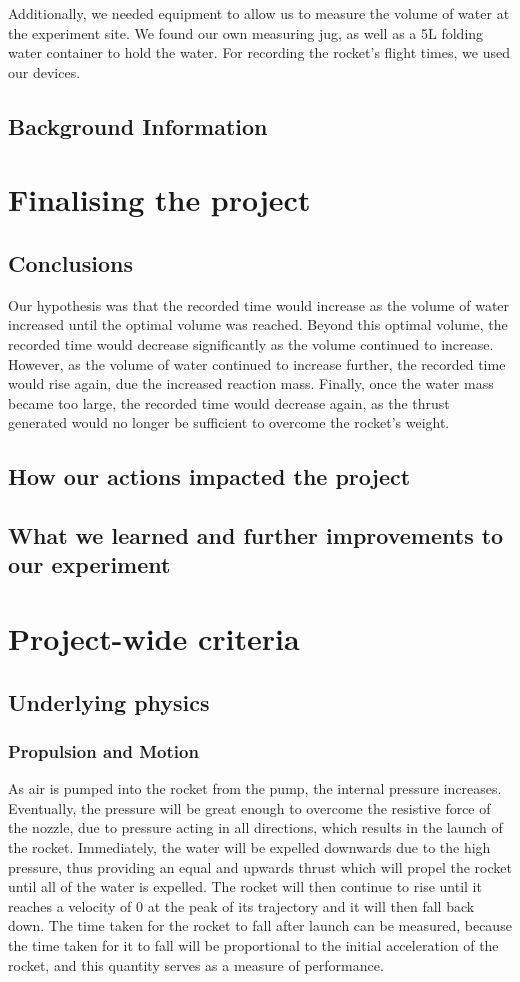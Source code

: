 \documentclass[14pt]{article}
\begin{document}
Additionally, we needed equipment to allow us to measure the volume of water at the experiment site. We found our own measuring jug, as well
as a 5L folding water container to hold the water. For recording the rocket’s flight times, we used  our devices.
\subsection{Background Information}
\section{Finalising the project}
\subsection{Conclusions}
Our hypothesis was that the recorded time would increase as the volume of water increased until the optimal volume was reached. Beyond this optimal volume, the recorded time would decrease significantly as the volume continued to increase. However, as the volume of water continued to increase further, the recorded time would rise again, due the increased reaction mass. Finally, once the water mass became too large, the recorded time would decrease again, as the thrust generated would no longer be sufficient to overcome the rocket’s weight.
\subsection{How our actions impacted the project}
\subsection{What we learned and further improvements to our experiment}
\section{Project-wide criteria}
\subsection{Underlying physics}
\subsubsection{Propulsion and Motion}
As air is pumped into the rocket from the pump, the internal pressure increases. Eventually, the pressure will be great enough to overcome the resistive force of the nozzle, due to pressure acting in all directions, which results in the launch of the rocket. Immediately, the water will be expelled downwards due to the high pressure, thus providing an equal and upwards thrust which will propel the rocket until all of the water is expelled. The rocket will then continue to rise until it reaches a velocity of 0 at the peak of its trajectory and it will then fall back down. The time taken for the rocket to fall after launch can be measured, because the time taken for it to fall will be proportional to the initial acceleration of the rocket, and this quantity serves as a measure of performance. 
\end{document}
